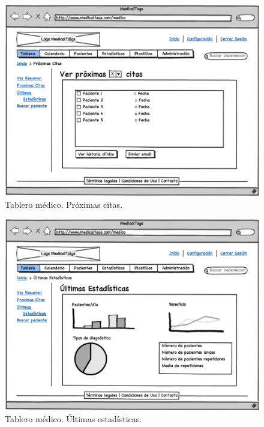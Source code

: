 \documentclass[a4paper,oneside,11pt]{book}
\begin{document}
			
			\begin{figure}[H]
			  \centering
			    \includegraphics[width=12cm]{img/eps/9_Dashboard_Medico_Tablero_Citas.eps}
			  \caption{Tablero médico. Próximas citas.}
			  \label{fig:tablero_medico_citas}
			\end{figure}
			
			\begin{figure}[H]
			  \centering
			    \includegraphics[width=12cm]{img/eps/10_Dashboard_Medico_Tablero_Estadisticas.eps}
			  \caption{Tablero médico. Últimas estadísticas.}
			  \label{fig:tablero_medico_estadisticas}
			\end{figure}
			
\end{document}
